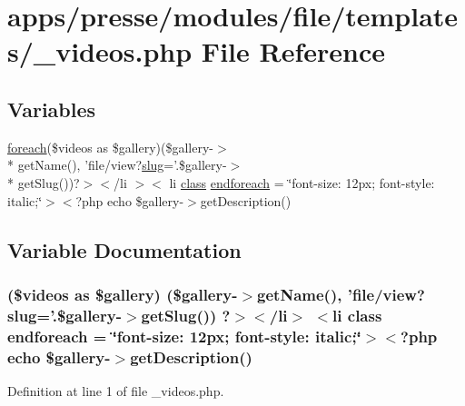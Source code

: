 \hypertarget{presse_2modules_2file_2templates_2__videos_8php}{\section{apps/presse/modules/file/templates/\-\_\-videos.php File Reference}
\label{presse_2modules_2file_2templates_2__videos_8php}
}
\subsection*{Variables}
\begin{DoxyCompactItemize}
\item 
\hyperlink{presse_2modules_2news_2templates_2index_success_8php_abc56db52b2e9a59bcd5c9e45ac5cb332}{foreach}(\$videos as \$gallery)(\$gallery-\/$>$\\*
get\-Name(), 'file/view?\hyperlink{backend_2modules_2ipn_2templates_2view_success_8php_a2b7d6694be020169de3a660b1b93a40d}{slug}='.\$gallery-\/$>$\\*
get\-Slug())?$>$$<$/li $>$$<$ li \hyperlink{live_2modules_2news_2templates_2__actualitelight_8php_a185c73c6507391d1eb38c776b68ce96d}{class} \hyperlink{presse_2modules_2file_2templates_2__videos_8php_ab2b1e42e113e7c347af37a574b516a10}{endforeach} = \char`\"{}font-\/size\-: 12px; font-\/style\-: italic;\char`\"{}$>$$<$?php echo \$gallery-\/$>$get\-Description()
\end{DoxyCompactItemize}


\subsection{Variable Documentation}
\hypertarget{presse_2modules_2file_2templates_2__videos_8php_ab2b1e42e113e7c347af37a574b516a10}{
\subsubsection[{endforeach}]{ (\$videos as \$gallery) (\$gallery-\/$>$get\-Name(), 'file/view?{\bf slug}='.\$gallery-\/$>$get\-Slug()) ?$>$$<$/li$>$ $<$li {\bf class} endforeach = \char`\"{}font-\/size\-: 12px; font-\/style\-: italic;\char`\"{}$>$$<$?php echo \$gallery-\/$>$get\-Description()}}\label{presse_2modules_2file_2templates_2__videos_8php_ab2b1e42e113e7c347af37a574b516a10}


Definition at line 1 of file \-\_\-videos.\-php.

